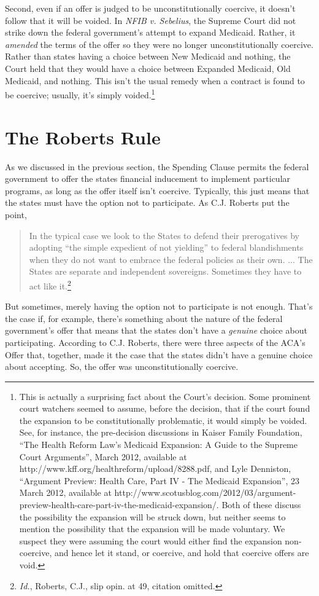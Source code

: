 Second, even if an offer is judged to be unconstitutionally coercive, it doesn't follow that it will be voided. In \emph{NFIB v. Sebelius}, the Supreme Court did not strike down the federal government's attempt to expand Medicaid. Rather, it \emph{amended} the terms of the offer so they were no longer unconstitutionally coercive. Rather than states having a choice between New Medicaid and nothing, the Court held that they would have a choice between Expanded Medicaid, Old Medicaid, and nothing. This isn't the usual remedy when a contract is found to be coercive; usually, it's simply voided.\footnote{This is actually a surprising fact about the Court's decision. Some prominent court watchers seemed to assume, before the decision, that if the court found the expansion to be constitutionally problematic, it would simply be voided. See, for instance, the pre-decision discussions in Kaiser Family Foundation, ``The Health Reform Law's Medicaid Expansion:
A Guide to the Supreme Court Arguments'', March 2012, available at http://www.kff.org/healthreform/upload/8288.pdf, and Lyle Denniston, ``Argument Preview: Health Care, Part IV - The Medicaid Expansion'', 23 March 2012, available at http://www.scotusblog.com/2012/03/argument-preview-health-care-part-iv-the-medicaid-expansion/. Both of these discuss the possibility the expansion will be struck down, but neither seems to mention the possibility that the expansion will be made voluntary. We suspect they were assuming the court would either find the expansion non-coercive, and hence let it stand, or coercive, and hold that coercive offers are void.}

\section{The Roberts Rule
}
As we discussed in the previous section, the Spending Clause permits the federal government to offer the states financial inducement to implement particular programs, as long as the offer itself isn't coercive. Typically, this just means that the states must have the option not to participate. As C.J. Roberts put the point,

\begin{quote}
In the typical case we look to the States to defend their prerogatives by adopting ``the simple expedient of not yielding'' to federal blandishments when they do not want to embrace the federal policies as their own. ... The States are separate and independent sovereigns. Sometimes they have to act like it.\footnote{\emph{Id.}, Roberts, C.J., slip opin. at 49, citation omitted.}
\end{quote}
But sometimes, merely having the option not to participate is not enough. That's the case if, for example, there's something about the nature of the federal government's offer that means that the states don't have a \emph{genuine} choice about participating. According to C.J. Roberts, there were three aspects of the ACA's Offer that, together, made it the case that the states didn't have a genuine choice about accepting. So, the offer was unconstitutionally coercive.

